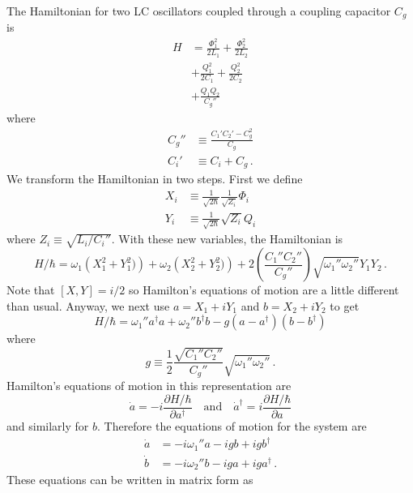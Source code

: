 The Hamiltonian for two LC oscillators coupled through a coupling capacitor $C_g$ is
\begin{align}
  H
  &= \frac{\Phi_1^2}{2 L_1} + \frac{\Phi_2^2}{2 L_2} \\
  &+ \frac{Q_1^2}{2 C_1} + \frac{Q_2^2}{2 C_2} \\
  &+ \frac{Q_1 Q_2}{C_g''}
\end{align}
where
\begin{align}
  C_g'' &\equiv \frac{C_1' C_2' - C_g^2}{C_g} \\
  C_i' &\equiv C_i + C_g \, .
\end{align}
We transform the Hamiltonian in two steps.
First we define
\begin{align*}
  X_i &\equiv \frac{1}{\sqrt{2 \hbar}} \frac{1}{\sqrt{Z_i}} \Phi_i \\
  Y_i &\equiv \frac{1}{\sqrt{2 \hbar}} \sqrt{Z_i} Q_i
\end{align*}
where $Z_i \equiv \sqrt{L_i / C_i''}$.
With these new variables, the Hamiltonian is
\begin{equation}
  H/\hbar =
    \omega_1 \left(X_1^2 + Y_1^2) \right)
  + \omega_2 \left(X_2^2 + Y_2^2) \right)
  + 2 \left( \frac{C_1'' C_2''}{C_g''} \right) \sqrt{\omega_1'' \omega_2''} Y_1 Y_2 \, .
\end{equation}
Note that $[X, Y] = i/2$ so Hamilton's equations of motion are a little different than usual.
Anyway, we next use $a = X_1 + i Y_1$ and $b = X_2 + i Y_2$ to get
\begin{equation}
  H / \hbar =
    \omega_1'' a^\dagger a
  + \omega_2'' b^\dagger b
  - g (a - a^\dagger) (b - b^\dagger)
\end{equation}
where
\begin{equation}
  g \equiv \frac{1}{2} \frac{\sqrt{C_1'' C_2''}}{C_g''} \sqrt{\omega_1'' \omega_2''} \, .
\end{equation}
Hamilton's equations of motion in this representation are
\begin{equation*}
  \dot{a} = -i \frac{\partial H/\hbar}{\partial a^\dagger}
  \quad \text{and} \quad
  \dot{a}^\dagger = i \frac{\partial H/\hbar}{\partial a}
\end{equation*}
and similarly for $b$.
Therefore the equations of motion for the system are
\begin{align*}
  \dot a &= -i \omega_1'' a -i g b + i g b^\dagger \\
  \dot b &= -i \omega_2'' b -i g a + i g a^\dagger \, .
\end{align*}
These equations can be written in matrix form as
